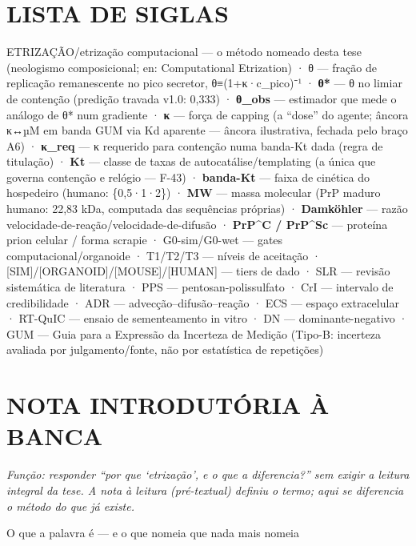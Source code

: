 \documentclass[12pt,a4paper,oneside]{report}
\begin{document}
\tableofcontents
\listoffigures
\listoftables
\hypertarget{lista-de-siglas}{%
\chapter*{LISTA DE SIGLAS}\label{lista-de-siglas}}

ETRIZAÇÃO/etrização computacional --- o método nomeado desta tese
(neologismo composicional; en: Computational Etrization) · θ --- fração
de replicação remanescente no pico secretor, θ≡(1+κ·c\_pico)⁻¹ ·
\textbf{θ*} --- θ no limiar de contenção (predição travada v1.0: 0,333)
· \textbf{θ\_obs} --- estimador que mede o análogo de θ* num gradiente ·
\textbf{κ} --- força de capping (a ``dose'' do agente; âncora κ↔µM em
banda GUM via Kd aparente --- âncora ilustrativa, fechada pelo braço A6)
· \textbf{κ\_req} --- κ requerido para contenção numa banda-Kt dada
(regra de titulação) · \textbf{Kt} --- classe de taxas de
autocatálise/templating (a única que governa contenção e relógio ---
F-43) · \textbf{banda-Kt} --- faixa de cinética do hospedeiro (humano:
\{0,5·1·2\}) · \textbf{MW} --- massa molecular (PrP maduro humano: 22,83
kDa, computada das sequências próprias) · \textbf{Damköhler} --- razão
velocidade-de-reação/velocidade-de-difusão · \textbf{PrP\^{}C /
PrP\^{}Sc} --- proteína prion celular / forma scrapie · G0-sim/G0-wet
--- gates computacional/organoide · T1/T2/T3 --- níveis de aceitação ·
{[}SIM{]}/{[}ORGANOID{]}/{[}MOUSE{]}/{[}HUMAN{]} --- tiers de dado · SLR
--- revisão sistemática de literatura · PPS --- pentosan-polissulfato ·
CrI --- intervalo de credibilidade · ADR --- advecção--difusão--reação ·
ECS --- espaço extracelular · RT-QuIC --- ensaio de sementeamento in
vitro · DN --- dominante-negativo · GUM --- Guia para a Expressão da
Incerteza de Medição (Tipo-B: incerteza avaliada por julgamento/fonte,
não por estatística de repetições)

\hypertarget{nota-introdutuxf3ria-uxe0-banca}{%
\chapter{NOTA INTRODUTÓRIA À
BANCA}\label{nota-introdutuxf3ria-uxe0-banca}}

\emph{Função: responder ``por que `etrização', e o que a diferencia?''
sem exigir a leitura integral da tese. A nota à leitura (pré-textual)
definiu o termo; aqui se diferencia o método do que já existe.}

O que a palavra é --- e o que nomeia que nada mais nomeia
\end{document}
